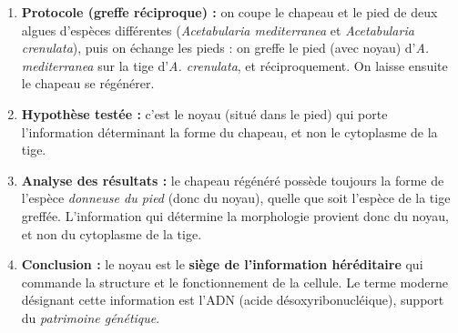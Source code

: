 \documentclass[11pt]{article}
\newcommand{\cle}[1]{{\popxbold\color{popdark}#1}}
\begin{document}
\begin{corrige}
\begin{enumerate}
    \item \textbf{Protocole (greffe réciproque) :} on coupe le chapeau et le pied de deux algues d'espèces différentes (\emph{Acetabularia mediterranea} et \emph{Acetabularia crenulata}), puis on échange les pieds : on greffe le pied (avec noyau) d'\emph{A. mediterranea} sur la tige d'\emph{A. crenulata}, et réciproquement. On laisse ensuite le chapeau se régénérer.
    \item \textbf{Hypothèse testée :} c'est le \cle{noyau} (situé dans le pied) qui porte l'information déterminant la forme du chapeau, et non le cytoplasme de la tige.
    \item \textbf{Analyse des résultats :} le chapeau régénéré possède toujours la forme de l'espèce \emph{donneuse du pied} (donc du noyau), quelle que soit l'espèce de la tige greffée. L'information qui détermine la morphologie provient donc du noyau, et non du cytoplasme de la tige.
    \item \textbf{Conclusion :} le noyau est le \textbf{siège de l'information héréditaire} qui commande la structure et le fonctionnement de la cellule. Le terme moderne désignant cette information est l'\cle{ADN} (acide désoxyribonucléique), support du \emph{patrimoine génétique}.
\end{enumerate}
\end{corrige}
\end{document}
